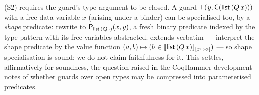 \begin{remark}
\label{rem:spec-shapes}
(S2) requires the guard's type argument to be closed.  A guard
$\mathsf{T}(y, \mathsf{C}(\mathsf{list}\,(Q\,x)))$ with a free data
variable $x$ (arising under a binder) can be specialised too, by a
\emph{shape} predicate: rewrite to
$\mathsf{P}_{\mathsf{list}\,(Q\,\cdot)}(x, y)$, a fresh binary predicate
indexed by the type pattern with its free variables abstracted.
 extends verbatim --- interpret the shape
predicate by the value function $(a, b) \mapsto (b \in
[\![ \mathsf{list}\,(Q\,x) ]\!]_{[x \mapsto a]})$ --- so shape
specialisation is sound; we do not claim faithfulness for it.  This
settles, affirmatively for soundness, the question raised in the
CoqHammer development notes of whether guards over open types may
be compressed into parameterised predicates.
\end{remark}
